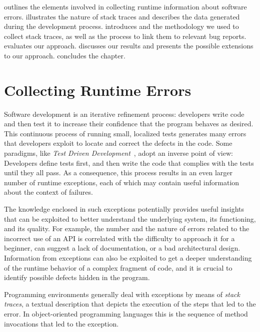  outlines the elements involved in collecting runtime information about software errors.
 illustrates the nature of stack traces and describes the data generated during the development process.
 introduces \slr and the methodology we used to collect stack traces, as well as the process to link them to relevant bug reports.
 evaluates our approach.
 discusses our results and presents the possible extensions to our approach.
 concludes the chapter.

\newpage

\section{Collecting Runtime Errors} \label{sec:stacktraces-intro}

Software development is an iterative refinement process: developers write code and then test it to increase their confidence that the program behaves as desired.
This continuous process of running small, localized tests generates many errors that developers exploit to locate and correct the defects in the code.
Some paradigms, like \emph{Test Driven Development}~\cite{BeckTDD}, adopt an inverse point of view: Developers define tests first, and then write the code that complies with the tests until they all pass.
As a consequence, this process results in an even larger number of runtime exceptions, each of which may contain useful information about the context of failures.

The knowledge enclosed in such exceptions potentially provides useful insights that can be exploited to better understand the underlying system, its functioning, and its quality.
For example, the number and the nature of errors related to the incorrect use of an API is correlated with the difficulty to approach it for a beginner, can suggest a lack of documentation, or a bad architectural design.
Information from exceptions can also be exploited to get a deeper understanding of the runtime behavior of a complex fragment of code, and it is crucial to identify possible defects hidden in the program.

Programming environments generally deal with exceptions by means of \emph{stack traces}, a textual description that depicts the execution of the steps that led to the error.
In object-oriented programming languages this is the sequence of method invocations that led to the exception.

